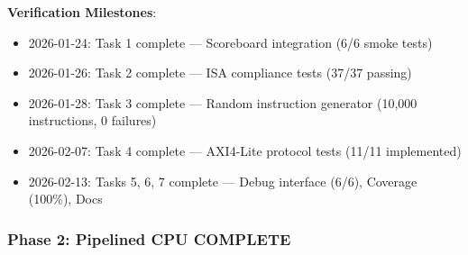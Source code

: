 \begin{record}
\textbf{Verification Milestones}:

\begin{itemize}
\tightlist
\item
  2026-01-24: Task 1 complete --- Scoreboard integration (6/6 smoke
  tests)
\item
  2026-01-26: Task 2 complete --- ISA compliance tests (37/37 passing)
\item
  2026-01-28: Task 3 complete --- Random instruction generator (10,000
  instructions, 0 failures)
\item
  2026-02-07: Task 4 complete --- AXI4-Lite protocol tests (11/11
  implemented)
\item
  2026-02-13: Tasks 5, 6, 7 complete --- Debug interface (6/6), Coverage
  (100\%), Docs
\end{itemize}

\end{record}

\subsubsection{\texorpdfstring{Phase 2: Pipelined CPU \ok{}
COMPLETE}{Phase 2: Pipelined CPU  COMPLETE}}\label{cr:status:phase-status:phase-2-pipelined-cpu-white-check-mark-complete}

